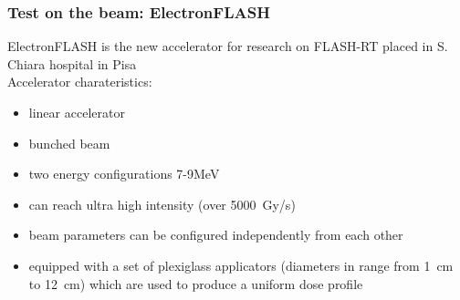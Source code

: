     \begin{frame}[noframenumbering]
        \frametitle{Test on the beam: ElectronFLASH}
        ElectronFLASH is the new accelerator for research on FLASH-RT placed in S. Chiara hospital in Pisa \\
        \medskip
        Accelerator charateristics: 
        \begin{itemize}
            \item linear accelerator
            \item bunched beam
            \item two energy configurations 7-9\si{MeV}
            \item can reach ultra high intensity (over \SI{5000}{Gy/s})
            \item beam parameters can be configured independently from each other
            \item equipped with a set of plexiglass applicators (diameters in range from \SI{1}{cm} to \SI{12}{cm}) which are used to produce a uniform dose profile 
        \end{itemize}
    \end{frame}  

